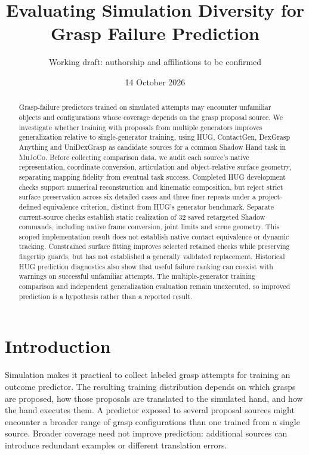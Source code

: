 \documentclass[10pt,letterpaper]{article}
\title{Evaluating Simulation Diversity for Grasp Failure Prediction}
\author{Working draft: authorship and affiliations to be confirmed}
\date{14 October 2026}
\begin{document}
\maketitle

\begin{abstract}
Grasp-failure predictors trained on simulated attempts may encounter unfamiliar
objects and configurations whose coverage depends on the grasp proposal source.
We investigate whether training with proposals from multiple generators improves
generalization relative to single-generator training, using HUG, ContactGen,
DexGrasp Anything and UniDexGrasp as candidate sources for a common Shadow Hand
task in MuJoCo. Before collecting comparison data, we audit each source's native
representation, coordinate conversion, articulation and object-relative surface
geometry, separating mapping fidelity from eventual task success.
Completed HUG development checks support numerical reconstruction and kinematic
composition, but reject strict surface preservation across six detailed cases
and three finer repeats under a project-defined equivalence criterion, distinct
from HUG's generator benchmark. Separate current-source checks establish
static realization of 32 saved retargeted Shadow commands, including native
frame conversion, joint limits and scene geometry. This scoped implementation
result does not establish native contact equivalence or dynamic tracking.
Constrained surface fitting improves selected retained checks while preserving
fingertip guards, but has not established a generally validated replacement. Historical HUG prediction diagnostics also
show that useful failure ranking can coexist with warnings on successful
unfamiliar attempts. The multiple-generator training comparison and independent
generalization evaluation remain unexecuted, so improved prediction is a
hypothesis rather than a reported result.
\end{abstract}


\section{Introduction}
Simulation makes it practical to collect labeled grasp attempts for training an
outcome predictor. The resulting training distribution depends on which grasps
are proposed, how those proposals are translated to the simulated hand, and how
the hand executes them. A predictor exposed to several proposal sources might
encounter a broader range of grasp configurations than one trained from a single
source. Broader coverage need not improve prediction: additional sources can
introduce redundant examples or different translation errors.
\end{document}
